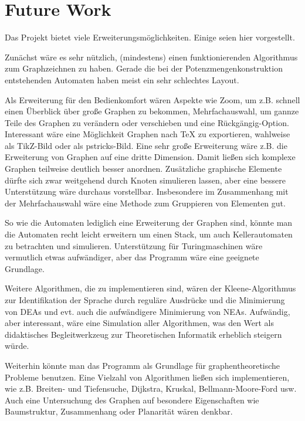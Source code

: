\chapter{Future Work}\label{FutureWork}
Das Projekt bietet viele Erweiterungsmöglichkeiten. Einige seien hier vorgestellt.

Zunächst wäre es sehr nützlich, (mindestens) einen funktionierenden Algorithmus zum Graphzeichnen zu haben. Gerade die bei der Potenzmengenkonstruktion entstehenden Automaten haben meist ein sehr schlechtes Layout.

Als Erweiterung für den Bedienkomfort wären Aspekte wie Zoom, um z.B. schnell einen Überblick über große Graphen zu bekommen, Mehrfachauswahl, um gannze Teile des Graphen zu verändern oder verschieben und eine Rückgängig-Option. Interessant wäre eine Möglichkeit Graphen nach TeX zu exportieren, wahlweise als TikZ-Bild oder als pstricks-Bild. Eine sehr große Erweiterung wäre z.B. die Erweiterung von Graphen auf eine dritte Dimension. Damit ließen sich komplexe Graphen teilweise deutlich besser anordnen. Zusätzliche graphische Elemente dürfte sich zwar weitgehend durch Knoten simulieren lassen, aber eine bessere Unterstützung wäre durchaus vorstellbar. Insbesondere im Zusammenhang mit der Mehrfachauswahl wäre eine Methode zum Gruppieren von Elementen gut.

So wie die Automaten lediglich eine Erweiterung der Graphen sind, könnte man die Automaten recht leicht erweitern um einen Stack, um auch Kellerautomaten zu betrachten und simulieren. Unterstützung für Turingmaschinen wäre vermutlich etwas aufwändiger, aber das Programm wäre eine geeignete Grundlage.

Weitere Algorithmen, die zu implementieren sind, wären der Kleene-Algorithmus zur Identifikation der Sprache durch reguläre Ausdrücke und die Minimierung von DEAs und evt. auch die aufwändigere Minimierung von NEAs. Aufwändig, aber interessant, wäre eine Simulation aller Algorithmen, was den Wert als didaktisches Begleitwerkzeug zur Theoretischen Informatik erheblich steigern würde.

Weiterhin könnte man das Programm als Grundlage für graphentheoretische Probleme benutzen. Eine Vielzahl von Algorithmen ließen sich implementieren, wie z.B. Breiten- und Tiefensuche, Dijkstra, Kruskal, Bellmann-Moore-Ford usw. Auch eine Untersuchung des Graphen auf besondere Eigenschaften wie Baumstruktur, Zusammenhang oder Planarität wären denkbar.
